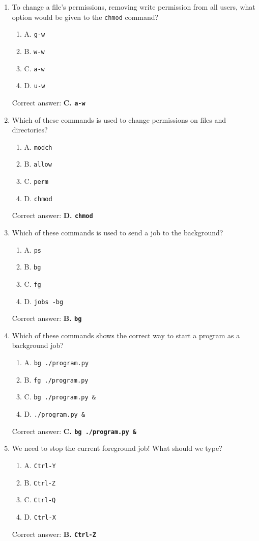 \documentclass{article}
\begin{document}
\begin{enumerate}
  \item To change a file's permissions, removing write permission from all users, what option would be given to the \texttt{chmod} command?
  \begin{enumerate}
    \item A. \texttt{g-w}
    \item B. \texttt{w-w}
    \item C. \texttt{a-w}
    \item D. \texttt{u-w}
  \end{enumerate}
  Correct answer: \textbf{C. \texttt{a-w}}
  
  \item Which of these commands is used to change permissions on files and directories?
  \begin{enumerate}
    \item A. \texttt{modch}
    \item B. \texttt{allow}
    \item C. \texttt{perm}
    \item D. \texttt{chmod}
  \end{enumerate}
  Correct answer: \textbf{D. \texttt{chmod}}
  
  \item Which of these commands is used to send a job to the background?
  \begin{enumerate}
    \item A. \texttt{ps}
    \item B. \texttt{bg}
    \item C. \texttt{fg}
    \item D. \texttt{jobs -bg}
  \end{enumerate}
  Correct answer: \textbf{B. \texttt{bg}}
  
  \item Which of these commands shows the correct way to start a program as a background job?
  \begin{enumerate}
    \item A. \texttt{bg ./program.py}
    \item B. \texttt{fg ./program.py}
    \item C. \texttt{bg ./program.py \&}
    \item D. \texttt{./program.py \&}
  \end{enumerate}
  Correct answer: \textbf{C. \texttt{bg ./program.py \&}}
  
  \item We need to stop the current foreground job! What should we type?
  \begin{enumerate}
    \item A. \texttt{Ctrl-Y}
    \item B. \texttt{Ctrl-Z}
    \item C. \texttt{Ctrl-Q}
    \item D. \texttt{Ctrl-X}
  \end{enumerate}
  Correct answer: \textbf{B. \texttt{Ctrl-Z}}
\end{enumerate}
\end{document}
